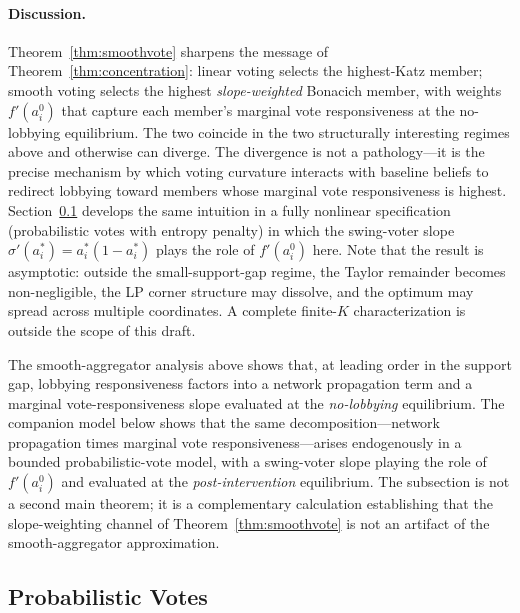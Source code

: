 \documentclass[11pt,letterpaper]{article}
\theoremstyle{plain}
\theoremstyle{definition}
\theoremstyle{remark}
\begin{document}
\paragraph{Discussion.} Theorem~\ref{thm:smoothvote} sharpens the message of Theorem~\ref{thm:concentration}: linear voting selects the highest-Katz member; smooth voting selects the highest \emph{slope-weighted} Bonacich member, with weights $f'(a^0_i)$ that capture each member's marginal vote responsiveness at the no-lobbying equilibrium. The two coincide in the two structurally interesting regimes above and otherwise can diverge. The divergence is not a pathology---it is the precise mechanism by which voting curvature interacts with baseline beliefs to redirect lobbying toward members whose marginal vote responsiveness is highest. Section~\ref{sec:modelB} develops the same intuition in a fully nonlinear specification (probabilistic votes with entropy penalty) in which the swing-voter slope $\sigma'(a_i^*) = a_i^*(1 - a_i^*)$ plays the role of $f'(a^0_i)$ here. Note that the result is asymptotic: outside the small-support-gap regime, the Taylor remainder becomes non-negligible, the LP corner structure may dissolve, and the optimum may spread across multiple coordinates. A complete finite-$K$ characterization is outside the scope of this draft.


The smooth-aggregator analysis above shows that, at leading order in the support gap, lobbying responsiveness factors into a network propagation term and a marginal vote-responsiveness slope evaluated at the \emph{no-lobbying} equilibrium. The companion model below shows that the same decomposition---network propagation times marginal vote responsiveness---arises endogenously in a bounded probabilistic-vote model, with a swing-voter slope playing the role of $f'(a^0_i)$ and evaluated at the \emph{post-intervention} equilibrium. The subsection is not a second main theorem; it is a complementary calculation establishing that the slope-weighting channel of Theorem~\ref{thm:smoothvote} is not an artifact of the smooth-aggregator approximation.

\subsection{Probabilistic Votes}
\label{sec:modelB}
\end{document}
